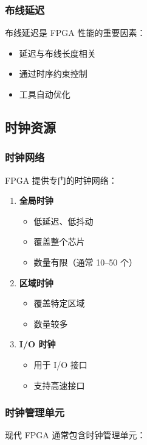 \subsubsection{布线延迟}

布线延迟是 FPGA 性能的重要因素：
\begin{itemize}
  \item 延迟与布线长度相关
  \item 通过时序约束控制
  \item 工具自动优化
\end{itemize}

\subsection{时钟资源}

\subsubsection{时钟网络}

FPGA 提供专门的时钟网络：
\begin{enumerate}
  \item \textbf{全局时钟}
    \begin{itemize}
      \item 低延迟、低抖动
      \item 覆盖整个芯片
      \item 数量有限（通常 10--50 个）
    \end{itemize}

  \item \textbf{区域时钟}
    \begin{itemize}
      \item 覆盖特定区域
      \item 数量较多
    \end{itemize}

  \item \textbf{I/O 时钟}
    \begin{itemize}
      \item 用于 I/O 接口
      \item 支持高速接口
    \end{itemize}
\end{enumerate}

\subsubsection{时钟管理单元}

现代 FPGA 通常包含时钟管理单元：

